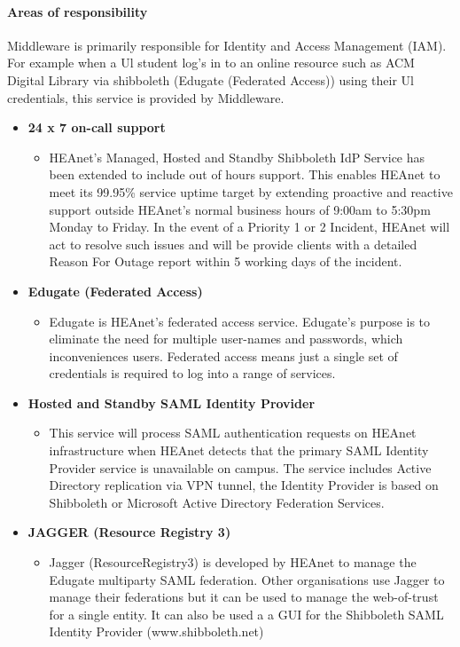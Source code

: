 \documentclass{article}
\begin{document}
	\paragraph{Areas of responsibility \newline}
	Middleware is primarily responsible for Identity and Access Management (IAM). For example when a Ul student log's in to an online resource such as ACM Digital Library via shibboleth (Edugate (Federated Access)) using their Ul credentials, this service is provided by Middleware.
	\begin{itemize}
		\item \textbf{24 x 7  on-call support}
		\begin{itemize}
			\item HEAnet's Managed, Hosted and Standby Shibboleth IdP Service has been extended to include out of hours support. This enables HEAnet to meet its 99.95\% service uptime target by extending proactive and reactive support outside HEAnet's normal business hours of 9:00am to 5:30pm Monday to Friday. In the event of a Priority 1 or 2 Incident, HEAnet will act to resolve such issues and will be provide clients with a detailed Reason For Outage report within 5 working days of the incident.
		\end{itemize}
		\item \textbf{Edugate (Federated Access)}
		\begin{itemize}
			\item Edugate is HEAnet's federated access service. Edugate's purpose is to eliminate the need for multiple user-names and passwords, which inconveniences users. Federated access means just a single set of credentials is required to log into a range of services.
		\end{itemize}
		\item \textbf{Hosted and Standby SAML Identity Provider}
		\begin{itemize}
			\item This service will process SAML authentication requests on HEAnet infrastructure when HEAnet detects that the primary SAML Identity Provider service is unavailable on campus. The service includes Active Directory replication via VPN tunnel, the Identity Provider is based on Shibboleth or Microsoft Active Directory Federation Services.
		\end{itemize}
		\item \textbf{JAGGER (Resource Registry 3)}
		\begin{itemize}
			\item 	Jagger (ResourceRegistry3) is developed by HEAnet to manage the Edugate multiparty SAML federation. Other organisations use Jagger to manage their federations but it can be used to manage the web-of-trust for a single entity. It can also be used a a GUI for the Shibboleth SAML Identity Provider (www.shibboleth.net)

\end{itemize}
\end{itemize}
\end{document}
